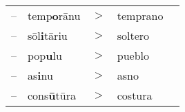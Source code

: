 \documentclass[convert={density=300,size=1080x800,outext=.png}]{standalone}
\begin{document}
\begin{tabular}{llcll}
-- & temp\textbf{o}r\={a}nu     & $>$ & temprano \\
-- & s\={o}l\textbf{i}t\={a}riu & $>$ & soltero \\
-- & pop\textbf{u}lu            & $>$ & pueblo\\
-- & as\textbf{i}nu             & $>$ & asno \\
-- & cons\textbf{\={u}}t\={u}ra & $>$ & costura\\
\end{tabular}
\end{document}
